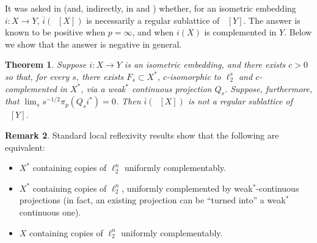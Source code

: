 \documentclass{amsart}
\theoremstyle{plain}
\newtheorem{theorem}{Theorem}[section]
\theoremstyle{definition}
\newtheorem{remark}[theorem]{Remark}
\numberwithin{equation}{section}
\DeclareMathOperator{\FBLp}{FBL^{\mathit{(p)}}}
\begin{document}

It was asked in \cite{AD} (and, indirectly, in \cite{OiTTT} and \cite{OiTTT-cor}) whether, for an isometric embedding $i : X \to Y$, $\overline{i}(\FBLp[X])$ is necessarily a regular sublattice of $\FBLp[Y]$. The answer is known to be positive when $p=\infty$, and when $i(X)$ is complemented in $Y$. Below we show that the answer is negative in general.

\begin{theorem}\label{complem l2}
Suppose $i : X \to Y$ is an isometric embedding, and there exists $c > 0$ so that, for every $s$, there exists $F_s \subset X^*$, $c$-isomorphic to $\ell_2^s$ and $c$-complemented in $X^*$, via a weak$^*$ continuous projection $Q_s$.
Suppose, furthermore, that $\lim_s s^{-1/2} \pi_p(Q_s i^*) = 0$. Then $\overline{i}(\FBLp[X])$ is not a regular sublattice of $\FBLp[Y]$.
\end{theorem}

\begin{remark}\label{weak-star complementability}
Standard local reflexivity results \cite{OjP} show that the following are equivalent:
\begin{itemize}
    \item $X^*$ containing copies of $\ell_2^n$ uniformly complementably.
    \item $X^*$ containing copies of $\ell_2^n$, uniformly complemented by weak$^*$-continuous projections (in fact, an existing projection can be ``turned into'' a weak$^*$ continuous one).
    \item $X$ containing copies of $\ell_2^n$ uniformly complementably.
\end{itemize}
\end{remark}
\end{document}
